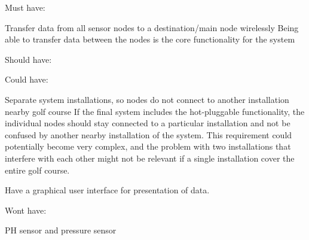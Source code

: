 
Must have:
\item Transfer data from all sensor nodes to a destination/main node wirelessly
Being able to transfer data between the nodes is the core functionality for the system









Should have:





Could have:
\item Separate system installations, so nodes do not connect to another installation nearby golf course
If the final system includes the hot-pluggable functionality, the individual nodes should stay connected to a particular installation and not be confused by another nearby installation of the system. This requirement could potentially become very complex, and the problem with two installations that interfere with each other might not be relevant if a single installation cover the entire golf course.

\item Have a graphical user interface for presentation of data.

Wont have:
\item PH sensor and pressure sensor








